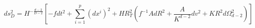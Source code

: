 \begin{equation}
\label{metans2}
ds_{D}^2 = H^{-\frac{d-2}{D-2}}
\left[ - f dt^2 + \sum_{i=1}^p (dx^i)^2
 + H R_T^2
\left( f^{-1} A dR^2 + \frac{A}{K^{d-2}} dv^2
+ K R^2 d\Omega_{d-2}^2 \right) \right]
\end{equation}

